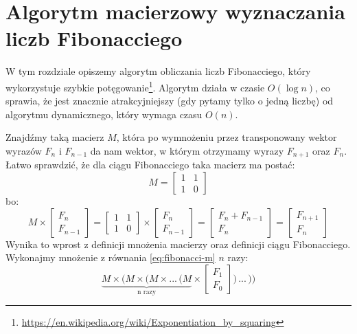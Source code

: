 \section{Algorytm macierzowy wyznaczania liczb Fibonacciego}

W tym rozdziale opiszemy algorytm obliczania liczb Fibonacciego, który wykorzystuje szybkie potęgowanie\footnote{\url{https://en.wikipedia.org/wiki/Exponentiation_by_squaring}}.
Algorytm działa w czasie $O(\log{n})$, co sprawia, że jest znacznie atrakcyjniejszy (gdy pytamy tylko o jedną liczbę) od algorytmu dynamicznego, który wymaga czasu $O(n)$.

Znajdźmy taką macierz $M$, która po wymnożeniu przez transponowany wektor wyrazów $F_{n}$ i $F_{n - 1}$ da nam wektor, w którym otrzymamy wyrazy $F_{n + 1}$ oraz $F_{n}$. 
Łatwo sprawdzić, że dla ciągu Fibonacciego taka macierz ma postać:
\begin{equation*}
  M = \begin{bmatrix}1 & 1 \\ 1 & 0\end{bmatrix}
\end{equation*}
bo:
\begin{equation}
  \label{eq:fibonacci-m}
  M
  \times
  \begin{bmatrix}F_n \\ F_{n - 1}\end{bmatrix}
  =
  \begin{bmatrix}1 & 1 \\ 1 & 0\end{bmatrix}
  \times
  \begin{bmatrix}F_n \\ F_{n - 1}\end{bmatrix}
  =
  \begin{bmatrix}F_n + F_{n - 1} \\ F_{n}\end{bmatrix}
  =
  \begin{bmatrix}F_{n + 1} \\ F_{n}\end{bmatrix}
\end{equation}
Wynika to wprost z definicji mnożenia macierzy oraz definicji ciągu Fibonacciego.
Wykonajmy mnożenie z równania \ref{eq:fibonacci-m} $n$ razy:
\begin{equation*}
  \underbrace{M \times \bigg(M \times \bigg(M \times ...\,\bigg(M}_\text{n razy}
  \times
  \begin{bmatrix}F_1 \\ F_0\end{bmatrix}\bigg)\,...\,\bigg)\bigg)
\end{equation*}

